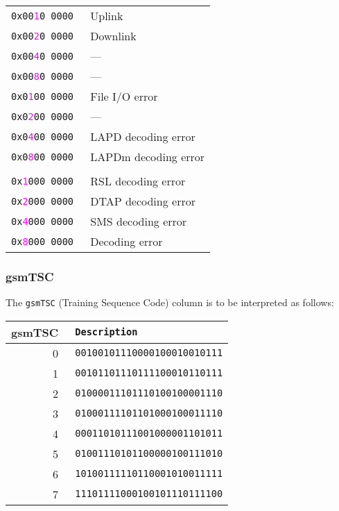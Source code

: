 \documentclass[documentation]{subfiles}
\begin{document}
\begin{longtable}{>{\tt}rl}
    0x00\textcolor{magenta}{1}0 0000 & Uplink\\
    0x00\textcolor{magenta}{2}0 0000 & Downlink\\
    0x00\textcolor{magenta}{4}0 0000 & ---\\
    0x00\textcolor{magenta}{8}0 0000 & ---\\

    0x0\textcolor{magenta}{1}00 0000 & File I/O error\\
    0x0\textcolor{magenta}{2}00 0000 & ---\\
    0x0\textcolor{magenta}{4}00 0000 & LAPD decoding error\\
    0x0\textcolor{magenta}{8}00 0000 & LAPDm decoding error\\
    \\
    0x\textcolor{magenta}{1}000 0000 & RSL decoding error\\
    0x\textcolor{magenta}{2}000 0000 & DTAP decoding error\\
    0x\textcolor{magenta}{4}000 0000 & SMS decoding error\\
    0x\textcolor{magenta}{8}000 0000 & Decoding error\\
    \bottomrule
\end{longtable}

\subsubsection{gsmTSC}\label{gsmTSC}
The {\tt gsmTSC} (Training Sequence Code) column is to be interpreted as follows:
\begin{longtable}{r>{\tt}l}
    \toprule
    {\bf gsmTSC} & {\bf Description}\\
    \midrule\endhead%
    0 & 00100101110000100010010111\\
    1 & 00101101110111100010110111\\
    2 & 01000011101110100100001110\\
    3 & 01000111101101000100011110\\
    4 & 00011010111001000001101011\\
    5 & 01001110101100000100111010\\
    6 & 10100111110110001010011111\\
    7 & 11101111000100101110111100\\
    \bottomrule
\end{longtable}
\end{document}
